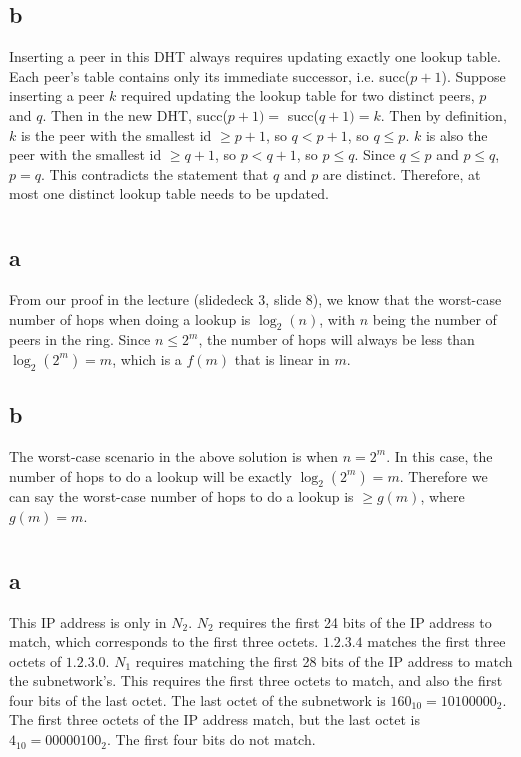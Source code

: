 \documentclass[10pt,a4paper]{article}
\begin{document}
\subsection*{b}
Inserting a peer in this DHT always requires updating exactly one lookup table. Each peer's table contains only its immediate successor, i.e. succ($p+1$). Suppose inserting a peer $k$ required updating the lookup table for two distinct peers, $p$ and $q$. Then in the new DHT, succ($p+1)=$ succ($q+1)=k$. Then by definition, $k$ is the peer with the smallest id $\geq p+1$, so $q<p+1$, so $q\leq p$. $k$ is also the peer with the smallest id $\geq q+1$, so $p<q+1$, so $p\leq q$. Since $q \leq p$ and $p \leq q$, $p=q$. This contradicts the statement that $q$ and $p$ are distinct. Therefore, at most one distinct lookup table needs to be updated.
\section{}
\subsection*{a}
From our proof in the lecture (slidedeck 3, slide 8), we know that the worst-case number of hops when doing a lookup is $\log_2(n)$, with $n$ being the number of peers in the ring. Since $n \leq 2^m$, the number of hops will always be less than $\log_2(2^m) = m$, which is a $f(m)$ that is linear in $m$.
\subsection*{b}
The worst-case scenario in the above solution is when $n = 2^m$. In this case, the number of hops to do a lookup will be exactly $\log_2(2^m) = m$. Therefore we can say the worst-case number of hops to do a lookup is $\geq g(m)$, where $g(m) = m$.
\section{}
\subsection*{a}
This IP address is only in $N_2$. $N_2$ requires the first 24 bits of the IP address to match, which corresponds to the first three octets. $1.2.3.4$ matches the first three octets of $1.2.3.0$. $N_1$ requires matching the first 28 bits of the IP address to match the subnetwork's. This requires the first three octets to match, and also the first four bits of the last octet. The last octet of the subnetwork is $160_{10}=10100000_{2}$. The first three octets of the IP address match, but the last octet is $4_{10}=00000100_{2}$. The first four bits do not match.
\end{document}
